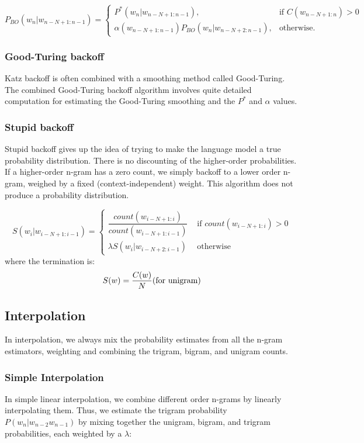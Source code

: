 \[
    P_{BO}(w_n|w_{n-N+1:n-1}) =
\begin{cases} 
    P^*(w_n|w_{n-N+1:n-1}), & \text{if } C(w_{n-N+1:n}) > 0 \\
    \alpha(w_{n-N+1:n-1}) P_{BO}(w_n|w_{n-N+2:n-1}), & \text{otherwise}.
\end{cases}
\]

\subsubsection{Good-Turing backoff}
Katz backoff is often combined with a smoothing method called Good-Turing. The combined Good-Turing backoff algorithm involves quite detailed computation for estimating the Good-Turing smoothing and the $P^*$ and $\alpha$ values.

\subsubsection{Stupid backoff}
Stupid backoff gives up the idea of trying to make the language model a true probability distribution. There is no discounting of the higher-order probabilities. If a higher-order n-gram has a zero count, we simply backoff to a lower order n-gram, weighed by a fixed (context-independent) weight. This algorithm does not produce a probability distribution.

\[
    S(w_i|w_{i-N+1:i-1}) = \begin{cases}
        \displaystyle\dfrac{count(w_{i-N+1:i})}{count(w_{i-N+1:i-1})} & \text{ if $count(w_{i-N+1:i}) > 0$}\\[0.2cm]
        \lambda S(w_i|w_{i-N+2:i-1}) & \text{ otherwise}
    \end{cases}
\]
where the termination is:
\[
    S(w) = \displaystyle\dfrac{C(w)}{N} \hfill \text{(for unigram)}
\]

\subsection{Interpolation}
In interpolation, we always mix the probability estimates from all the n-gram estimators, weighting and combining the trigram, bigram, and unigram counts.

\subsubsection{Simple Interpolation}
In simple linear interpolation, we combine different order n-grams by linearly interpolating them. Thus, we estimate the trigram probability $P(w_n|w_{n-2}w_{n-1})$ by mixing together the unigram, bigram, and trigram probabilities, each weighted by a $\lambda$:

